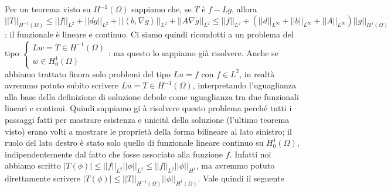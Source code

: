 \documentclass{article}
\begin{document}
Per un teorema visto su $H^{-1}\left( \Omega \right) $ sappiamo che, se 
$T$ \`{e} $f-Lg$, allora $\left\vert \left\vert T\right\vert \right\vert
_{H^{-1}\left( \Omega \right) }\leq \left\vert \left\vert f\right\vert
\right\vert _{L^{2}}+\left\vert \left\vert dg\right\vert \right\vert
_{L^{2}}+\left\vert \left\vert \left\langle b,\nabla g\right\rangle
\right\vert \right\vert _{L^{2}}+\left\vert \left\vert A\nabla g\right\vert
\right\vert _{L^{2}}\leq \left\vert \left\vert f\right\vert \right\vert
_{L^{2}}+\left( \left\vert \left\vert d\right\vert \right\vert _{L^{\infty
}}+\left\vert \left\vert b\right\vert \right\vert _{L^{\infty }}+\left\vert
\left\vert A\right\vert \right\vert _{L^{\infty }}\right) \left\vert
\left\vert g\right\vert \right\vert _{H^{1}\left( \Omega \right) }$: il
funzionale \`{e} lineare e continuo. Ci siamo quindi ricondotti a un
problema del tipo $\left\{ 
\begin{array}{c}
Lw=T\in H^{-1}\left( \Omega \right) \\ 
w\in H_{0}^{1}\left( \Omega \right)%
\end{array}%
\right. $: ma questo lo sappiamo gi\`{a} risolvere. Anche se abbiamo
trattato finora solo problemi del tipo $Lu=f$ con $f\in L^{2}$, in realt\`{a}
avremmo potuto subito scrivere $Lu=T\in H^{-1}\left( \Omega \right) $,
interpretando l'uguaglianza alla base della definizione di soluzione debole
come uguaglianza tra due funzionali lineari e continui. Quindi sappiamo gi%
\`{a} risolvere questo problema perch\'{e} tutti i passaggi fatti per
mostrare esistenza e unicit\`{a} della soluzione (l'ultimo teorema visto)
erano volti a mostrare le propriet\`{a} della forma bilineare al lato
sinistro; il ruolo del lato destro \`{e} stato solo quello di funzionale
lineare continuo su $H_{0}^{1}\left( \Omega \right) $, indipendentemente dal
fatto che fosse associato alla funzione $f$. Infatti noi abbiamo scritto $%
\left\vert T\left( \phi \right) \right\vert \leq \left\vert \left\vert
f\right\vert \right\vert _{L^{2}}\left\vert \left\vert \phi \right\vert
\right\vert _{L^{2}}\leq \left\vert \left\vert f\right\vert \right\vert
_{L^{2}}\left\vert \left\vert \phi \right\vert \right\vert _{H^{1}}$, ma
avremmo potuto direttamente scrivere $\left\vert T\left( \phi \right)
\right\vert \leq \left\vert \left\vert T\right\vert \right\vert
_{H^{-1}\left( \Omega \right) }\left\vert \left\vert \phi \right\vert
\right\vert _{H^{1}\left( \Omega \right) }$. Vale quindi il seguente
\end{document}
